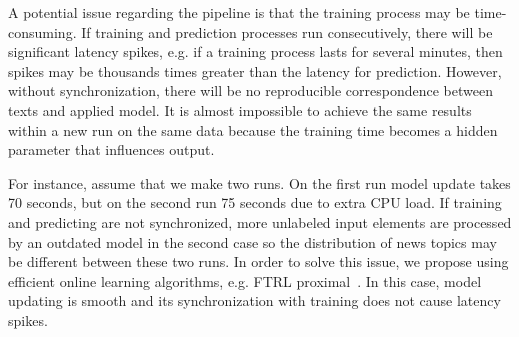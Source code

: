 A potential issue regarding the pipeline is that the training process may be time-consuming. If training and prediction processes run consecutively, there will be significant latency spikes, e.g. if a training process lasts for several minutes, then spikes may be thousands times greater than the latency for prediction. However, without synchronization, there will be no reproducible correspondence between texts and applied model. It is almost impossible to achieve the same results within a new run on the same data because the training time becomes a hidden parameter that influences output. 

For instance, assume that we make two runs. On the first run model update takes 70 seconds, but on the second run 75 seconds due to extra CPU load. If training and predicting are not synchronized, more unlabeled input elements are processed by an outdated model in the second case so the distribution of news topics may be different between these two runs. In order to solve this issue, we propose using efficient online learning algorithms, e.g. FTRL proximal~\cite{mcmahan2013ad}. In this case, model updating is smooth and its synchronization with training does not cause latency spikes.